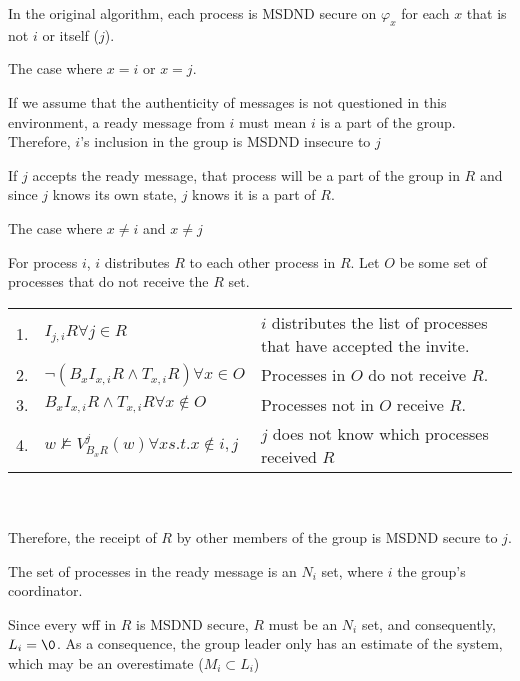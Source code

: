 \begin{thm}
    In the original algorithm, each process is MSDND secure on $\varphi_x$ for each $x$ that is not $i$ or itself ($j$).
\end{thm}

\begin{case}
    The case where $x = i$ or $x = j$.
\end{case}

If we assume that the authenticity of messages is not questioned in this environment, a ready message from $i$ must mean $i$ is a part of the group.
Therefore, $i$'s inclusion in the group is MSDND insecure to $j$

If $j$ accepts the ready message, that process will be a part of the group in $R$ and since $j$ knows its own state, $j$ knows it is a part of $R$.

\begin{case}
    The case where $x \neq i$ and $x \neq j$
\end{case}

For process $i$, $i$ distributes $R$ to each other process in $R$.
Let $O$ be some set of processes that do not receive the $R$ set.

\begin{table}[h!]
\centering
\small
\begin{tabularx}{\linewidth}{l X X}
1. & $I_{j,i} R \forall j \in R $ & $i$ distributes the list of processes that have accepted the invite.  \\
2. & $\neg(B_x I_{x,i} R \wedge T_{x,i} R) \forall x \in O$ & Processes in $O$ do not receive $R$. \\
3. & $B_x I_{x,i} R \wedge T_{x,i} R \forall x \not \in O$ & Processes not in $O$ receive $R$. \\
4. & $w \not \vDash V_{B_x R}^{j}(w) \forall x s.t. x \not \in {i,j}$ & $j$ does not know which processes received $R$ \\
\end{tabularx} \\~\\
Therefore, the receipt of $R$ by other members of the group is MSDND secure to $j$.
\label{tab:readynsetproof}
\end{table}

\begin{cor}
    The set of processes in the ready message is an $N_i$ set, where $i$ the group's coordinator.
\end{cor}

Since every wff in $R$ is MSDND secure, $R$ must be an $N_i$ set, and consequently, $L_i = \0$.
As a consequence, the group leader only has an estimate of the system, which may be an overestimate ($M_i \subset L_i$)

